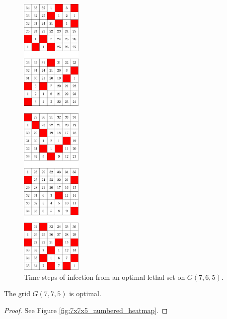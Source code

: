 \begin{figure}[H]
\centering
\includegraphics[width=0.26\textwidth]{figures/A/7x6x5_numbered_heatmap.pdf}
\caption{Time steps of infection from an optimal lethal set on $G(7,6,5)$.}
\label{fig:7x6x5_numbered_heatmap}
\end{figure}

\newpage

\begin{con}
\label{con:7x7x5}
The grid $G(7,7,5)$ is optimal.
\end{con}

\begin{proof}
See Figure \ref{fig:7x7x5_numbered_heatmap}.
\end{proof}


